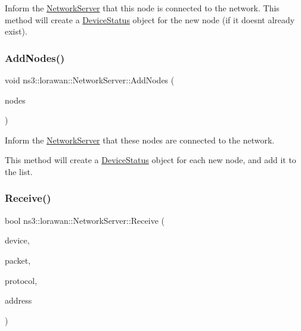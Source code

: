 Inform the \hyperlink{classns3_1_1lorawan_1_1NetworkServer}{Network\+Server} that this node is connected to the network. This method will create a \hyperlink{classns3_1_1lorawan_1_1DeviceStatus}{Device\+Status} object for the new node (if it doesn\textquotesingle{}t already exist). \mbox{\label{classns3_1_1lorawan_1_1NetworkServer_ac2be7db7fbcd5acdbaeb3f8127164e2f}} 
\subsubsection{\texorpdfstring{Add\+Nodes()}{AddNodes()}}
{\footnotesize\ttfamily void ns3\+::lorawan\+::\+Network\+Server\+::\+Add\+Nodes (\begin{DoxyParamCaption}\item[{Node\+Container}]{nodes }\end{DoxyParamCaption})}

Inform the \hyperlink{classns3_1_1lorawan_1_1NetworkServer}{Network\+Server} that these nodes are connected to the network.

This method will create a \hyperlink{classns3_1_1lorawan_1_1DeviceStatus}{Device\+Status} object for each new node, and add it to the list. \mbox{\label{classns3_1_1lorawan_1_1NetworkServer_ab7b09f2cbc07147690dbea2da7b2b357}} 
\subsubsection{\texorpdfstring{Receive()}{Receive()}}
{\footnotesize\ttfamily bool ns3\+::lorawan\+::\+Network\+Server\+::\+Receive (\begin{DoxyParamCaption}\item[{Ptr$<$ \hyperlink{classNetDevice}{Net\+Device} $>$}]{device,  }\item[{Ptr$<$ const Packet $>$}]{packet,  }\item[{uint16\+\_\+t}]{protocol,  }\item[{const Address \&}]{address }\end{DoxyParamCaption})}

